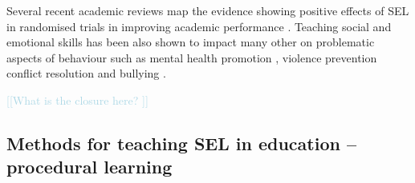 \documentclass[prodmode,acmtochi]{acmsmall}
\newcommand{\todo}[1]{\textrm{\textrm{\textcolor{LightBlue}{[[#1]]}}}}
\newcommand{\rephrase}[1]{\textrm{\textrm{\textcolor{gray}{#1}}}}
\begin{document}
Several recent academic reviews map the evidence showing positive effects of SEL in randomised trials in improving academic performance \cite{Durlak2011,Greenberg2010,Weare2011}. %
%
         Teaching social and emotional skills has been also shown to impact many other on problematic aspects of behaviour such as mental health promotion \cite{Adi et al 2007a}, violence prevention \cite{Mytton 2002,Adi2007b} conflict resolution \cite{Garrard and Lipsey, 2007} and bullying \cite{Vreeman and Carroll, 2007}. 
        
        \todo{What is the closure here? }
        
        

        \fi



\subsection{Methods for teaching SEL in education -- procedural learning}
\label{sec:methods}
 
\end{document}
